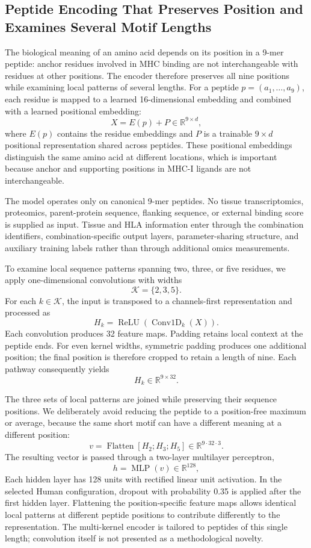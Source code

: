 \subsection{Peptide Encoding That Preserves Position and Examines Several Motif Lengths}

The biological meaning of an amino acid depends on its position in a 9-mer peptide: anchor residues involved in MHC binding are not interchangeable with residues at other positions. The encoder therefore preserves all nine positions while examining local patterns of several lengths. For a peptide \(p=(a_1,\ldots,a_9)\), each residue is mapped to a learned 16-dimensional embedding and combined with a learned positional embedding:
\[
X=E(p)+P \in \mathbb{R}^{9\times d},
\]
where \(E(p)\) contains the residue embeddings and \(P\) is a trainable \(9\times d\) positional representation shared across peptides. These positional embeddings distinguish the same amino acid at different locations, which is important because anchor and supporting positions in MHC-I ligands are not interchangeable.

The model operates only on canonical 9-mer peptides. No tissue transcriptomics, proteomics, parent-protein sequence, flanking sequence, or external binding score is supplied as input. Tissue and HLA information enter through the combination identifiers, combination-specific output layers, parameter-sharing structure, and auxiliary training labels rather than through additional omics measurements.

To examine local sequence patterns spanning two, three, or five residues, we apply one-dimensional convolutions with widths
\[
\mathcal{K}=\{2,3,5\}.
\]
For each \(k\in\mathcal{K}\), the input is transposed to a channels-first representation and processed as
\[
H_k
=
\operatorname{ReLU}
\left(
\operatorname{Conv1D}_{k}(X)
\right).
\]
Each convolution produces 32 feature maps. Padding retains local context at the peptide ends. For even kernel widths, symmetric padding produces one additional position; the final position is therefore cropped to retain a length of nine. Each pathway consequently yields
\[
H_k\in\mathbb{R}^{9\times 32}.
\]

The three sets of local patterns are joined while preserving their sequence positions. We deliberately avoid reducing the peptide to a position-free maximum or average, because the same short motif can have a different meaning at a different position:
\[
v
=
\operatorname{Flatten}
\left[
H_2;H_3;H_5
\right]
\in\mathbb{R}^{9\cdot32\cdot3}.
\]
The resulting vector is passed through a two-layer multilayer perceptron,
\[
h
=
\operatorname{MLP}(v)
\in\mathbb{R}^{128},
\]
Each hidden layer has 128 units with rectified linear unit activation. In the selected Human configuration, dropout with probability 0.35 is applied after the first hidden layer. Flattening the position-specific feature maps allows identical local patterns at different peptide positions to contribute differently to the representation. The multi-kernel encoder is tailored to peptides of this single length; convolution itself is not presented as a methodological novelty.

